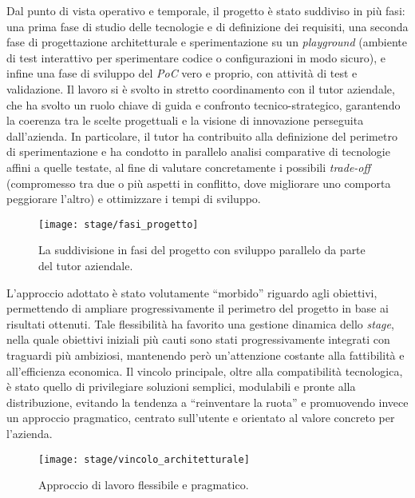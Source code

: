 Dal punto di vista operativo e temporale, il progetto è stato suddiviso in più fasi: una prima fase di studio delle tecnologie e di definizione dei requisiti, 
una seconda fase di progettazione architetturale e sperimentazione su un \emph{playground} (ambiente di test interattivo per sperimentare codice o configurazioni in modo sicuro), e infine una fase di sviluppo del \emph{PoC} vero e proprio, con attività di test e validazione. 
Il lavoro si è svolto in stretto coordinamento con il tutor aziendale, che ha svolto un ruolo chiave di guida e confronto tecnico-strategico, garantendo la coerenza tra 
le scelte progettuali e la visione di innovazione perseguita dall’azienda. 
In particolare, il tutor ha contribuito alla definizione del perimetro di sperimentazione e 
ha condotto in parallelo analisi comparative di tecnologie affini a quelle testate, al fine di valutare concretamente i possibili \emph{trade-off} (compromesso tra due o più aspetti in conflitto, dove migliorare uno comporta peggiorare l’altro) e ottimizzare i tempi di sviluppo.
\begin{figure}[H]
    \centering
    \texttt{[image: stage/fasi\_progetto]}
    \caption{La suddivisione in fasi del progetto con sviluppo parallelo da parte del tutor aziendale.}
    \label{fig:fasi_progetto}
  \end{figure}
L’approccio adottato è stato volutamente “morbido” riguardo agli obiettivi, permettendo di ampliare progressivamente il perimetro del progetto in base ai risultati ottenuti. 
Tale flessibilità ha favorito una gestione dinamica dello \emph{stage}, nella quale obiettivi iniziali più cauti sono stati progressivamente integrati con traguardi più ambiziosi, 
mantenendo però un’attenzione costante alla fattibilità e all’efficienza economica. 
Il vincolo principale, oltre alla compatibilità tecnologica, è stato quello di privilegiare soluzioni semplici, modulabili e pronte alla distribuzione, evitando la tendenza a “reinventare la ruota” 
e promuovendo invece un approccio pragmatico, centrato sull’utente e orientato al valore concreto per l’azienda.
\begin{figure}[H]
    \centering
    \texttt{[image: stage/vincolo\_architetturale]}
    \caption{Approccio di lavoro flessibile e pragmatico.}
    \label{fig:vincolo_architetturale}
\end{figure}

